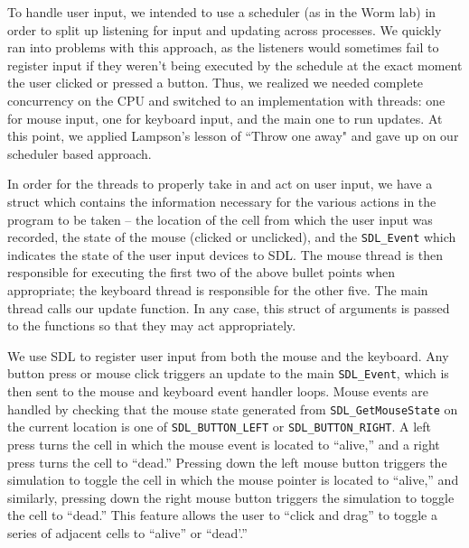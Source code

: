 \documentclass[onecolumn,12pt]{IEEEtran}
\begin{document}
  To handle user input, we intended to use a scheduler (as in the Worm lab) in
  order to split up listening for input and updating across processes. We quickly
  ran into problems with this approach, as the listeners would sometimes fail to
  register input if they weren't being executed by the schedule at the exact
  moment the user clicked or pressed a button. Thus, we realized we needed
  complete concurrency on the CPU and switched to an implementation with threads:
  one for mouse input, one for keyboard input, and the main one to run updates.
  At this point, we applied Lampson's lesson of ``Throw one away" and gave up on
  our scheduler based approach.

  In order for the threads to properly take in and act on user input, we have a
  struct which contains the information necessary for the various actions in the
  program to be taken -- the location of the cell from which the user input was
  recorded, the state of the mouse (clicked or unclicked), and the
  \texttt{SDL\_Event} which indicates the state of the user input devices to SDL.
  The mouse thread is then responsible for executing the first two of the above
  bullet points when appropriate; the keyboard thread is responsible for the
  other five. The main thread calls our update function. In any case, this struct
  of arguments is passed to the functions so that they may act appropriately. 

  We use SDL to register user input from both the mouse and the keyboard. Any
  button press or mouse click triggers an update to the main \texttt{SDL\_Event},
  which is then sent to the mouse and keyboard event handler loops. Mouse events
  are handled by checking that the mouse state generated from
  \texttt{SDL\_GetMouseState} on the current location is one of
  \texttt{SDL\_BUTTON\_LEFT} or \texttt{SDL\_BUTTON\_RIGHT}. A left press turns
  the cell in which the mouse event is located to ``alive,'' and a right press
  turns the cell to ``dead.'' Pressing down the left mouse button triggers the
  simulation to toggle the cell in which the mouse pointer is located to
  ``alive,'' and similarly, pressing down the right mouse button triggers the
  simulation to toggle the cell to ``dead.'' This feature allows the user to
  ``click and drag'' to toggle a series of adjacent cells to ``alive'' or
  ``dead'.''
\end{document}
